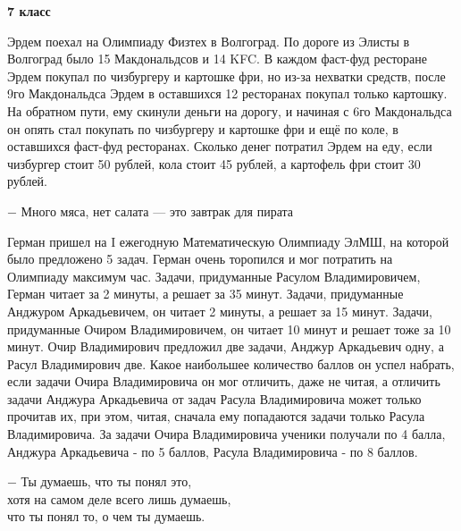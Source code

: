 \hspace{3mm}

\centerline{\bf \huge 7 класс}

\hspace{3mm} 

 Эрдем поехал на Олимпиаду Физтех в Волгоград. По дороге из Элисты в Волгоград было 15 Макдональдсов и 14 KFC. В каждом фаст-фуд ресторане Эрдем покупал по чизбургеру и картошке фри, но из-за нехватки средств, после 9го Макдональдса Эрдем в оставшихся 12 ресторанах покупал только картошку. На обратном пути, ему скинули деньги на дорогу, и начиная с 6го Макдональдса он опять стал покупать по чизбургеру и картошке фри и ещё по коле, в оставшихся фаст-фуд ресторанах. Сколько денег потратил Эрдем на еду, если чизбургер стоит 50 рублей, кола стоит 45 рублей, а картофель фри стоит 30 рублей.

\begin{flushright}
    \scriptsize{$-$ Много мяса, нет салата — это завтрак для пирата}
\end{flushright}

\hspace{3mm}

 Герман пришел на I ежегодную Математическую Олимпиаду ЭлМШ, на которой было предложено 5 задач. Герман очень торопился и мог потратить на Олимпиаду максимум час. Задачи, придуманные Расулом Владимировичем, Герман читает за 2 минуты, а решает за 35 минут. Задачи, придуманные Анджуром Аркадьевичем, он читает 2 минуты, а решает за 15 минут. Задачи, придуманные Очиром Владимировичем, он читает 10 минут и решает тоже за 10 минут. Очир Владимирович предложил две задачи, Анджур Аркадьевич одну, а Расул Владимирович две. Какое наибольшее количество баллов он успел набрать, если задачи Очира Владимировича он мог отличить, даже не читая, а отличить задачи Анджура Аркадьевича от задач Расула Владимировича может только прочитав их, при этом, читая, сначала ему попадаются задачи только Расула Владимировича. За задачи Очира Владимировича ученики получали по 4 балла, Анджура Аркадьевича - по 5 баллов, Расула Владимировича - по 8 баллов.

\begin{flushright}
    \scriptsize{$-$ Ты думаешь, что ты понял это,\\ хотя на самом деле всего лишь думаешь,\\ что ты понял то, о чем ты думаешь.}
\end{flushright}

\hspace{3mm}

